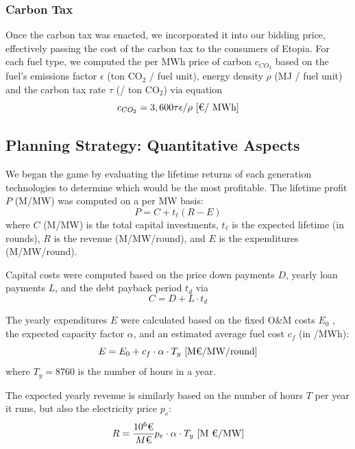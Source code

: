 \documentclass[journal,11pt]{IEEEtran}
\begin{document}
\subsubsection{Carbon Tax}

Once the carbon tax was enacted, we incorporated it into our bidding price, effectively passing the cost of the carbon tax to the consumers of Etopia.
For each fuel type, we computed the per MWh price of carbon $c_{CO_2}$ based on the fuel's emissions factor $\epsilon$ (ton CO$_2$ / fuel unit), energy density $\rho$ (MJ / fuel unit)
and the carbon tax rate $\tau$ (\texteuro / ton CO$_2$) via equation
\begin{equation}
  c_{CO_2} = 3,600 \tau \epsilon / \rho  \text{ [\texteuro / MWh]}
\end{equation}



\subsection{Planning Strategy: Quantitative Aspects}

We began the game by evaluating the lifetime returns of each generation technologies to determine which would be the most profitable.
The lifetime profit $P$ (M\texteuro/MW) was computed on a per MW basis:
\begin{equation}
  P = C + t_\ell (R - E)
\end{equation}
where $C$ (M\texteuro/MW) is the total capital investments, $t_\ell$ is the expected lifetime (in rounds), $R$ is the revenue (M\texteuro/MW/round), and $E$ is the expenditures (M\texteuro/MW/round).

Capital costs were computed based on the price down payments $D$, yearly loan payments $L$, and the debt payback period $t_d$ via
\begin{equation}
  C = D + L \cdot t_d
\end{equation}

The yearly expenditures $E$ were calculated based on the fixed O\&M costs $E_0$ , the expected capacity factor $\alpha$, and an estimated average fuel cost $c_f$
(in \texteuro/MWh):
\begin{equation}
  E = E_0 + c_f \cdot \alpha \cdot T_y \text{ [M\texteuro/MW/round]}
\end{equation}
where $T_y = 8760$ is the number of hours in a year.


The expected yearly revenue is similarly based on the number of hours $T$ per year it runs, but also the electricity price $p_e$:
\begin{equation}
  R = \frac{10^6 \text{\texteuro}}{M\text{\texteuro}}  p_e \cdot \alpha \cdot T_y \text{ [M \texteuro /MW]}
\end{equation}
\end{document}
